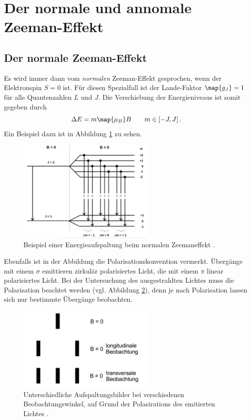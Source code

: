 \section{Der normale und annomale Zeeman-Effekt}

\subsection{Der normale Zeeman-Effekt}
Es wird immer dann vom \emph{normalen} Zeeman-Effekt gesprochen, wenn der Elektronspin $S=0$ ist.
Für diesen Spezialfall ist der Lande-Faktor $\map{g_J}=1$ für alle Quantenzahlen $L$ und $J$.
Die Verschiebung der Energieniveaus ist somit gegeben durch
\begin{equation}
  \label{eq: energie_normaler_zeeman}
  \Delta E=m\map{\mu_B}B \qquad m\in\left[-J,J\right].
\end{equation}
Ein Beispiel dazu ist in Abbildung \ref{fig: energie_normaler_zeeman} zu sehen.
\FloatBarrier
\begin{figure}[h]
  \centering
  \includegraphics[width=0.6\textwidth]{pics/enerieaufspaltung_normaler_zeeman.png}
  \caption{Beispiel einer Energieaufspaltung beim normalen Zeemaneffekt \cite{anleitung27}.}
  \label{fig: energie_normaler_zeeman}
\end{figure}
\FloatBarrier
Ebenfalls ist in der Abbildung die Polarisationskonvention vermerkt.
Übergänge mit einem $\sigma$ emittieren zirkulär polarisiertes Licht, die mit einem
$\pi$ linear polarisiertes Licht.
Bei der Untersuchung des ausgestrahlten Lichtes muss die Polarisation beachtet werden (vgl. Abbildung \ref{fig: beobachtung_energie}), denn
je nach Polarisation lassen sich nur bestimmte Übergänge beobachten.
\FloatBarrier
\begin{figure}[h]
  \centering
  \includegraphics[width=0.6\textwidth]{pics/beobachtung_energie.png}
  \caption{Unterschiedliche Aufspaltungsbilder bei verschiedenen Beobachtungswinkel, auf Grund der Polasirations des emitierten Lichtes \cite{anleitung27}.}
  \label{fig: beobachtung_energie}
\end{figure}
\FloatBarrier

